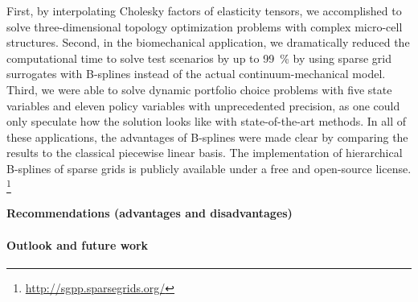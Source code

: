 First, by interpolating Cholesky factors of elasticity tensors,
we accomplished to solve three-dimensional topology optimization problems
with complex micro-cell structures.
Second, in the biomechanical application,
we dramatically reduced the computational time to solve
test scenarios by up to \SI{99}{\percent} by using
sparse grid surrogates with B-splines instead of the
actual continuum-mechanical model.
Third, we were able to solve dynamic portfolio choice problems
with five state variables and eleven policy variables
with unprecedented precision, as one could only speculate
how the solution looks like with state-of-the-art methods.
In all of these applications, the advantages of B-splines were made clear
by comparing the results to the classical piecewise linear basis.
The implementation of hierarchical B-splines of sparse grids is
publicly available under a free and open-source license.%
\footnote{%
  \url{http://sgpp.sparsegrids.org/}%
}

\paragraph{Recommendations (advantages and disadvantages)}


\dummytext[1]{}

\paragraph{Outlook and future work}


